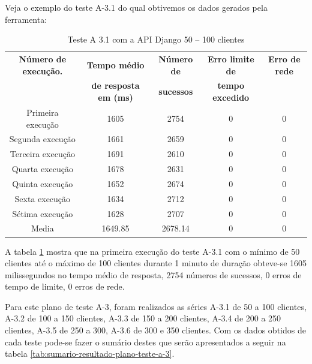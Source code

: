   Veja o exemplo do teste A-3.1 do qual obtivemos os dados gerados pela ferramenta:

  \begin{table}[H]
    \centering
    \footnotesize
    \setlength{\abovecaptionskip}{0pt}
    \setlength{\belowcaptionskip}{0pt}
    \caption[Teste A-3.1 com a API Django 50 – 100 clientes]{Teste A 3.1 com a API Django 50 – 100 clientes}
    \label{tab:teste-a-3-1}
    \begin{tabular}{c|c|c|c|c}
      \hline \hline
      \textbf{Número de execução.} & \textbf{Tempo médio } &	\textbf{Número de } & \textbf{Erro limite de} & \textbf{Erro de rede}  \\
	    {}			   & \textbf{de resposta em (ms) } &\textbf{sucessos } & \textbf{tempo excedido} & {}  \\
      \hline \hline
      Primeira execução &	1605 &				2754 &			0 &				0 \\
      Segunda execução &	1661 &				2659 &			0 &				0 \\
      Terceira execução &	1691 &				2610 &			0 &				0 \\
      Quarta execução  &	1678 &				2631 &			0 &				0 \\
      Quinta execução  &	1652 &				2674 &			0 &				0 \\
      Sexta execução   &	1634 &				2712 &			0 &				0 \\
      Sétima execução  &	1628 &				2707 &			0 &				0 \\
      Media & 			1649.85 &			2678.14 & 		0 &				0 \\
      \hline \hline
    \end{tabular}
  \end{table}

  A tabela \ref{tab:teste-a-3-1} mostra que na primeira execução do teste A-3.1 com o mínimo de 50 clientes até o máximo de 100 clientes
  durante 1 minuto de duração obteve-se 1605 milissegundos no tempo médio de resposta,
  2754 números de sucessos, 0 erros de tempo de limite, 0 erros de rede.

  Para este plano de teste A-3, foram realizados as séries A-3.1 de 50 a 100 clientes, A-3.2 de 100 a 150 clientes, A-3.3 de 150 a 200 clientes,
  A-3.4 de 200 a 250 clientes, A-3.5 de 250 a 300, A-3.6 de 300 e 350 clientes. Com os dados obtidos de cada teste pode-se fazer o sumário
  destes que serão apresentados a seguir na tabela \ref{tab:sumario-resultado-plano-teste-a-3}.

